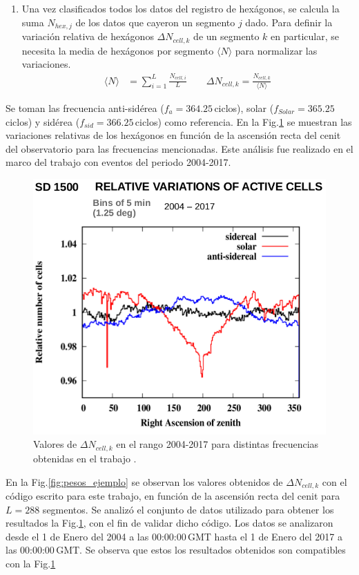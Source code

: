 \begin{enumerate}
        \item Una vez clasificados todos los datos del registro de hexágonos, se calcula la suma  $N_{hex, j}$ de los datos que cayeron un segmento $j$ dado. Para definir la variación relativa de hexágonos  $\Delta N_{cell,k}$ de un segmento $k$ en particular, se necesita la media de hexágonos por segmento $ \langle N \rangle$  para normalizar las variaciones.
       \begin{align}
         \langle N \rangle &= \sum^{L}_{i=1} \frac{N_{cell, i}}{L}  \qquad
         \Delta N_{cell,k} = \frac{N_{cell, k}}{\langle N \rangle}  \label{epepe}
       \end{align}

      \end{enumerate}
      Se toman las frecuencia anti-sidérea ($f_a=364.25\,$ciclos), solar ($f_{Solar}= 365.25\,$ciclos) y sidérea ($f_{sid}= 366.25\,$ciclos) como referencia. En la Fig.\ref{fig:pesos_referencia} se muestran las variaciones relativas de los hexágonos en función de la ascensión recta del cenit del observatorio para las frecuencias mencionadas. Este análisis fue realizado en el marco del trabajo \cite{referencia_pesos} con eventos del periodo 2004-2017. 

          \begin{figure}[H]
          \centering
              \includegraphics[width=0.5\linewidth]{pesos_referencia.png}  
              \caption{Valores de $\Delta N_{cell, k}$ en el rango 2004-2017 para distintas frecuencias obtenidas en el trabajo \cite{referencia_pesos}.}
              \label{fig:pesos_referencia}
        \end{figure}

       En la Fig.\ref{fig:pesos_ejemplo} se observan los valores obtenidos de $\Delta N_{cell,k}$  con el código escrito para este trabajo, en función de la ascensión recta del cenit  para $L=288$ segmentos. Se analizó el conjunto de datos  utilizado para obtener los resultados la Fig.\ref{fig:pesos_referencia}, con el fin de validar dicho código. Los datos se analizaron desde el 1 de Enero del 2004 a las 00:00:00\,GMT  hasta el 1 de Enero del 2017 a las 00:00:00\,GMT. Se  observa que estos los resultados obtenidos son compatibles con la Fig.\ref{fig:pesos_referencia}
      

